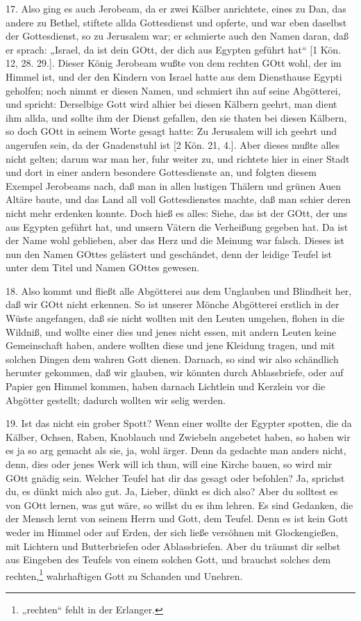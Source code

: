 17. Also ging es auch Jerobeam, da er zwei Kälber anrichtete, eines zu Dan, das andere zu Bethel, stiftete allda Gottesdienst und opferte, und war eben daselbst der Gottesdienst, so zu Jerusalem war; er schmierte auch den Namen daran, daß er sprach: „Israel, da ist dein GOtt, der dich aus Egypten geführt hat“ [1 Kön. 12, 28. 29.]. Dieser König Jerobeam wußte von dem rechten GOtt wohl, der im Himmel ist, und der den Kindern von Israel hatte aus dem Diensthause Egypti geholfen; noch nimmt er diesen Namen, und schmiert ihn auf seine Abgötterei, und spricht: Derselbige Gott wird alhier bei diesen Kälbern geehrt, man dient ihm allda, und sollte ihm der Dienst gefallen, den sie thaten bei diesen Kälbern, so doch GOtt in seinem Worte gesagt hatte: Zu Jerusalem will ich geehrt und angerufen sein, da der Gnadenstuhl ist [2 Kön. 21, 4.]. Aber dieses mußte alles nicht gelten; darum war man her, fuhr weiter zu, und richtete hier in einer Stadt und dort in einer andern besondere Gottesdienste an, und folgten diesem Exempel Jerobeams nach, daß man in allen lustigen Thälern und grünen Auen Altäre baute, und das Land all voll Gottesdienstes machte, daß man schier deren nicht mehr erdenken konnte. Doch hieß es alles: Siehe, das ist der GOtt, der uns aus Egypten geführt hat, und unsern Vätern die Verheißung gegeben hat. Da ist der Name wohl geblieben, aber das Herz und die Meinung war falsch. Dieses ist nun den Namen GOttes gelästert und geschändet, denn der leidige Teufel ist unter dem Titel und Namen GOttes gewesen.

18. Also kommt und fließt alle Abgötterei aus dem Unglauben und Blindheit her, daß wir GOtt nicht erkennen. So ist unserer Mönche Abgötterei erstlich in der Wüste angefangen, daß sie nicht wollten mit den Leuten umgehen, flohen in die Wildniß, und wollte einer dies und jenes nicht essen, mit andern Leuten keine Gemeinschaft haben, andere wollten diese und jene Kleidung tragen, und mit solchen Dingen dem wahren Gott dienen. Darnach, so sind wir also schändlich herunter gekommen, daß wir glauben, wir könnten durch Ablassbriefe, oder auf Papier gen Himmel kommen, haben darnach Lichtlein und Kerzlein vor die Abgötter gestellt; dadurch wollten wir selig werden.

19. Ist das nicht ein grober Spott? Wenn einer wollte der Egypter spotten, die da Kälber, Ochsen, Raben, Knoblauch und Zwiebeln angebetet haben, so haben wir es ja so arg gemacht als sie, ja, wohl ärger. Denn da gedachte man anders nicht, denn, dies oder jenes Werk will ich thun, will eine Kirche bauen, so wird mir GOtt gnädig sein. Welcher Teufel hat dir das gesagt oder befohlen? Ja, sprichst du, es dünkt mich also gut. Ja, Lieber, dünkt es dich also? Aber du solltest es von GOtt lernen, was gut wäre, so willst du es ihm lehren. Es sind Gedanken, die der Mensch lernt von seinem Herrn und Gott, dem Teufel. Denn es ist kein Gott weder im Himmel oder auf Erden, der sich ließe versöhnen mit Glockengießen, mit Lichtern und Butterbriefen oder Ablassbriefen. Aber du träumst dir selbst aus Eingeben des Teufels von einem solchen Gott, und brauchst solches dem rechten,\footnote{„rechten“ fehlt in der Erlanger.} wahrhaftigen Gott zu Schanden und Unehren.

